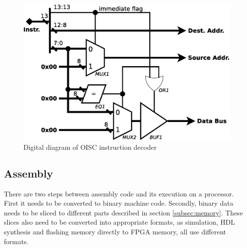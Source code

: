 \begin{figure}
	\centering
	\includegraphics[scale=0.4]{../resources/oisc_decoder.eps}
	\caption{Digital diagram of OISC instruction decoder}
	\label{fig:oisc_decoder}
\end{figure}

\subsection{Assembly}\label{subsec:assembly}
There are two steps between assembly code and its execution on a processor. First it needs to be converted to binary machine code. Secondly, binary data needs to be sliced to different parts described in section \ref{subsec:memory}. These slices also need to be converted into appropriate formats, as simulation, HDL synthesis and flashing memory directly to FPGA memory, all use different formats.

